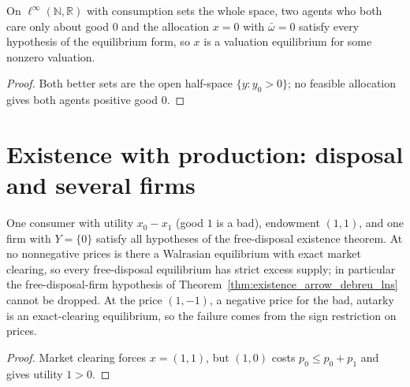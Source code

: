 \begin{theorem}
\label{thm:common_economy}
\leanok
{}
On $\ell^\infty(\mathbb{N}, \mathbb{R})$ with consumption sets the whole space, two agents who both care only about
good $0$ and the allocation $x = 0$ with $\bar\omega = 0$ satisfy every hypothesis of the equilibrium form, so $x$ is
a valuation equilibrium for some nonzero valuation.
\end{theorem}
\begin{proof}
\leanok
Both better sets are the open half-space $\{y : y_0 > 0\}$; no feasible allocation gives both agents positive good $0$.
\end{proof}

\section{Existence with production: disposal and several firms}
\label{sec:existence_witnesses}

\begin{theorem}
\label{thm:disposal_needed}
\leanok
{}
One consumer with utility $x_0 - x_1$ (good $1$ is a bad), endowment $(1,1)$, and one firm with $Y = \{0\}$ satisfy all
hypotheses of the free-disposal existence theorem. At no nonnegative prices is there a Walrasian equilibrium with exact
market clearing, so every free-disposal equilibrium has strict excess supply; in particular the free-disposal-firm
hypothesis of Theorem~\ref{thm:existence_arrow_debreu_lns} cannot be dropped. At the price $(1,-1)$, a negative price
for the bad, autarky is an exact-clearing equilibrium, so the failure comes from the sign restriction on prices.
\end{theorem}
\begin{proof}
\leanok
Market clearing forces $x = (1,1)$, but $(1,0)$ costs $p_0 \le p_0 + p_1$ and gives utility $1 > 0$.
\end{proof}

